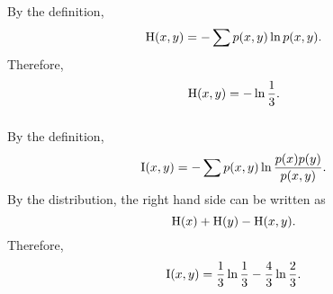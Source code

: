 \subsubsection{}
By the definition,
%
\begin{equation}
{\rm H}(x, y) = - \sum p(x, y) \ln p(x, y).
\end{equation}
%
Therefore,
%
\begin{equation}
{\rm H}(x, y) = - \ln \frac{1}{3}.
\end{equation}
%


\subsubsection{}
By the definition,
%
\begin{equation}
{\rm I}(x, y) = - \sum p(x, y) \ln \frac{p(x) p(y)}{p(x, y)}.
\end{equation}
%
By the distribution, the right hand side can be written as
%
\begin{equation}
{\rm H}(x) + {\rm H}(y) - {\rm H}(x, y).
\end{equation}
%
Therefore,
%
\begin{equation}
{\rm I}(x, y) = \frac{1}{3} \ln \frac{1}{3}- \frac{4}{3} \ln \frac{2}{3}.
\end{equation}
%




















